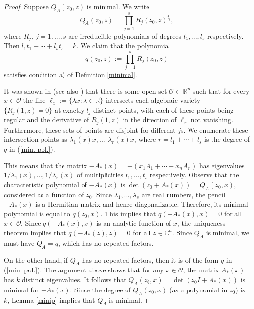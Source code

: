 \documentclass[draft, 12pt, reqno]{amsart}
\newcommand{\C}{{\mathbb C}}
\newcommand{\R}{{\mathbb R}}
\numberwithin{equation}{section}
\theoremstyle{plain}
\begin{document}
\begin{proof}

 Suppose $Q_A(z_0,z)$ is minimal. We write
\begin{equation}\label{char} Q_A(z_0,z)= \displaystyle \prod_{j=1}^s R_j(z_0,z)^{t_j}, \end{equation}
where $R_j, \ j=1,...,s$ are irreducible polynomials of degrees $l_1,...,l_s$ respectively. Then $l_1t_1+\cdots +l_st_s=k$. We claim that the polynomial 
\begin{equation}\label{min. pol.}
q(z_0,z):= \displaystyle \prod_{j=1}^s R_j(z_0,z) 
\end{equation}
satisfies condition a) of Definition  \ref{minimal}. 

It was shown in \cite{S1} (see also \cite{SY}) that there is some open set $\mathcal{O}\subset \R^n$ such that for every $x\in \mathcal{O}$ the line $\ell_x:=\{\lambda x: \lambda\in \R\}$ intersects each algebraic variety $\{R_j(1,z)=0\} $ at exactly $l_j$ distinct points,  
with each of these points being regular and the derivative of $R_j(1,z)$ in the direction of $\ell_x$ not vanishing. Furthermore, these sets of points are disjoint for different $j$s. We enumerate these intersection points as $\lambda_1(x) x,...,\lambda_r (x)x$, where $r=l_1+\cdots +l_s$ is the degree of $q$ in (\ref{min. pol.}). 

This means that the matrix $-A_*(x)=-(x_1A_1+\cdots +x_nA_n)$ has eigenvalues $1/\lambda_1(x),..., 1/\lambda_r(x)$ of multiplicities $t_1,...,t_s$ respectively. Observe that the characteristic polynomial of $-A_*(x)$ is $\det(z_0+A_*(x))=Q_A(z_0,x)$, considered as a function of $z_0$. Since $\lambda_1,...,\lambda_s$ are real numbers, the pencil $-A_*(x)$ is a Hermitian matrix and hence diagonalizable. Therefore, its minimal polynomial is equal to $q(z_0, x)$. This implies that $q(-A_*(x),x)=0$ for all $x\in \mathcal{O}$. Since $q(-A_*(x),x)$ is an analytic function of $x$, the uniqueness theorem implies that $q(-A_*(z),z)=0$ for all $z\in \C^n$.
Since $Q_A$ is minimal, we must have $Q_A=q$, which has no repeated factors.

On the other hand, if $Q_A$ has no repeated factors, then it is of the form $q$ in (\ref{min. pol.}). The argument above shows that for any $x\in \mathcal{O}$, the matrix $A_*(x)$ has $k$ distinct eigenvalues. It follows that $Q_A(z_0, x)=\det (z_0I+A_*(x))$ is minimal for $-A_*(x)$. Since the degree of $Q_A(z_0, x)$ (as a polynomial in $z_0$) is $k$, Lemma \ref{minip} implies that $Q_A$ is minimal.


\end{proof}
\end{document}
